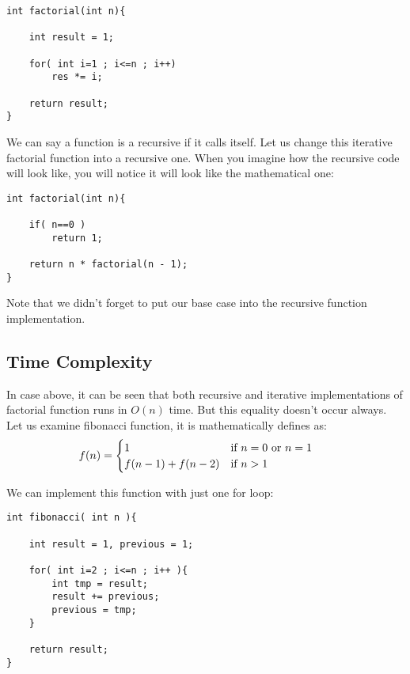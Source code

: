 \documentclass[12pt]{article}
\begin{document}
\begin{verbatim}
int factorial(int n){

    int result = 1;
    
    for( int i=1 ; i<=n ; i++)
        res *= i;
    
    return result;
}
\end{verbatim}

We can say a function is a recursive if it calls itself. Let us change this iterative factorial function into a recursive one. When you imagine how the recursive code will look like, you will notice it will look like the mathematical one:

\begin{verbatim}
int factorial(int n){
    
    if( n==0 )
        return 1;
    
    return n * factorial(n - 1);
}
\end{verbatim}

Note that we didn't forget to put our base case into the recursive function implementation.

\cleardoublepage

\subsection{Time Complexity}

In case above, it can be seen that both recursive and iterative implementations of factorial function runs in $O(n)$ time. But this equality doesn't occur always. Let us examine fibonacci function, it is mathematically defines as:
\begin{align*}
    f(n) &= \begin{cases}
    1 & \text{if $n = 0$ or $n = 1$\,\, } \\
    f(n - 1) + f(n - 2) & \text{if $n > 1$\,\,}
    \end{cases}
\end{align*}

We can implement this function with just one for loop:

\begin{verbatim}
int fibonacci( int n ){

    int result = 1, previous = 1;

    for( int i=2 ; i<=n ; i++ ){
        int tmp = result;
        result += previous;
        previous = tmp;
    }

    return result;
}
\end{verbatim}
\end{document}

